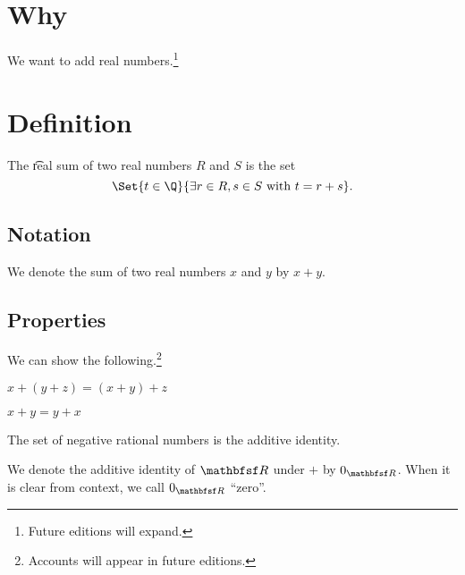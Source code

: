 

\section*{Why}

We want to add real numbers.\footnote{Future editions will expand.}

\section*{Definition}

The \t{real sum} of two real numbers $R$ and $S$ is the set
\[
\Set{t \in \Q }{\exists r \in R, s \in S \text{ with } t = r + s}.
\]

\subsection*{Notation}

We denote the sum of two real numbers $x$ and $y$ by $x + y$.

\subsection*{Properties}

We can show the following.\footnote{Accounts will appear in future editions.}

\begin{proposition}[Associative]
$x + (y + z) = (x + y) + z$

\end{proposition}

\begin{proposition}[Commutative]
$x + y = y + x$
\end{proposition}

\begin{proposition}[Identity]
The set of negative rational numbers is the additive identity.
\end{proposition}

We denote the additive identity of $\R $ under $+$ by $0_{\R }$.
When it is clear from context, we call $0_{\R }$ ``zero''.

\blankpage
